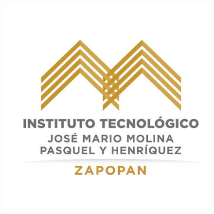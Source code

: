 \documentclass[12pt,titlepage]{article}
\begin{document}
\setlength{\parindent}{1.1cm} %
\setcounter{tocdepth}{4}
\setcounter{secnumdepth}{4}
\renewcommand{\labelitemi}{$\cdot$} %

\begin{titlepage} %

\begin{center} %
\begin{figure}[htbp]
\hspace*{1.8cm} 
\includegraphics[scale=0.39]{Tec_logo}
\end{figure}


\end{center}
\end{titlepage}
\end{document}
